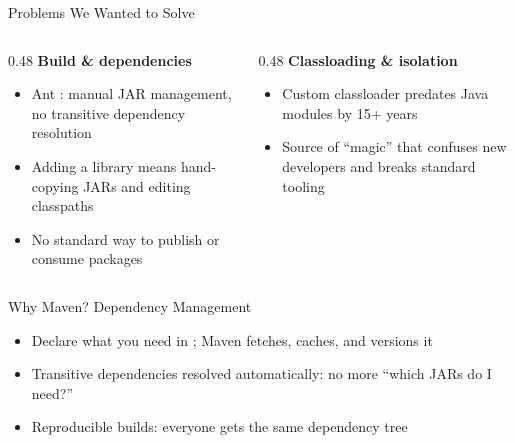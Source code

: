 
\begin{frame}{Problems We Wanted to Solve}
\begin{columns}[T]
\begin{column}{0.48\textwidth}
\textbf{Build \& dependencies}
\begin{itemize}
\item Ant : manual JAR management, no transitive dependency resolution
\item Adding a library means hand-copying JARs and editing classpaths
\item No standard way to publish or consume packages
\end{itemize}
\end{column}
\begin{column}{0.48\textwidth}
\textbf{Classloading \& isolation}
\begin{itemize}
\item Custom classloader predates Java modules by 15+ years
\item Source of ``magic'' that confuses new developers and breaks standard tooling
\end{itemize}
\end{column}
\end{columns}
\end{frame}

\begin{frame}{Why Maven? Dependency Management}
\begin{center}
\end{center}
\vspace{0.5em}
\begin{itemize}
\item Declare what you need in ; Maven fetches, caches, and versions it
\item Transitive dependencies resolved automatically: no more ``which JARs do I need?''
\item Reproducible builds: everyone gets the same dependency tree
\end{itemize}
\end{frame}

